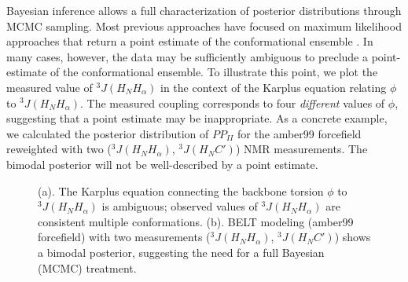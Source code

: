 \documentclass[journal=jacsat,manuscript=article]{achemso}
\begin{document}
Bayesian inference allows a full characterization of posterior distributions through MCMC sampling.  Most previous approaches have focused on maximum likelihood approaches that return a point estimate of the conformational ensemble \cite{rozycki2011saxs}.  In many cases, however, the data may be sufficiently ambiguous to preclude a point-estimate of the conformational ensemble.  To illustrate this point, we plot the measured \cite{Graf2007} value of $^3J(H_NH_\alpha)$ in the context of the Karplus equation relating $\phi$ to $^3J(H_NH_\alpha)$.  The measured coupling corresponds to four \emph{different} values of $\phi$, suggesting that a point estimate may be inappropriate.  As a concrete example, we calculated the posterior distribution of $PP_{II}$ for the amber99 forcefield reweighted with two ($^3J(H_NH_\alpha)$, $^3J(H_NC')$) NMR measurements.  The bimodal posterior will not be well-described by a point estimate.

\begin{figure}
\caption{
(a).  The Karplus equation connecting the backbone torsion $\phi$ to $^3J(H_NH_\alpha)$ is ambiguous; observed values of $^3J(H_NH_\alpha)$ are consistent multiple conformations.  (b).  BELT modeling (amber99 forcefield) with two measurements ($^3J(H_NH_\alpha)$, $^3J(H_NC')$) shows a bimodal posterior, suggesting the need for a full Bayesian (MCMC) treatment.  
}
\label{figure:Ambiguity}

\end{figure}
\end{document}
